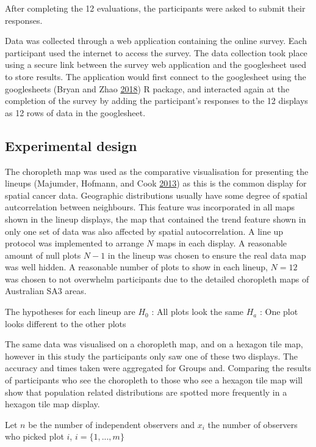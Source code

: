 \documentclass[conference,final,]{IEEEtran}
\begin{document}
After completing the 12 evaluations, the participants were asked to submit their responses.

Data was collected through a web application containing the online survey.
Each participant used the internet to access the survey.
The data collection took place using a secure link between the survey web application and the googlesheet used to store results. The application would first connect to the googlesheet using the googlesheets (Bryan and Zhao \protect\hyperlink{ref-sheets}{2018}) R package, and interacted again at the completion of the survey by adding the participant's responses to the 12 displays as 12 rows of data in the googlesheet.

\hypertarget{experimental-design}{%
\subsection{Experimental design}\label{experimental-design}}

The choropleth map was used as the comparative visualisation for presenting the lineups (Majumder, Hofmann, and Cook \protect\hyperlink{ref-VVSIALM}{2013}) as this is the common display for spatial cancer data.
Geographic distributions usually have some degree of spatial autcorrelation between neighbours.
This feature was incorporated in all maps shown in the lineup displays, the map that contained the trend feature shown in only one set of data was also affected by spatial autocorrelation.
A line up protocol was implemented to arrange \(N\) maps in each display.
A reasonable amount of null plots \(N-1\) in the lineup was chosen to ensure the real data map was well hidden. A reasonable number of plots to show in each lineup, \(N = 12\) was chosen to not overwhelm participants due to the detailed choropleth maps of Australian SA3 areas.

The hypotheses for each lineup are
\(H_0\) : All plots look the same
\(H_a\) : One plot looks different to the other plots

The same data was visualised on a choropleth map, and on a hexagon tile map, however in this study the participants only saw one of these two displays. The accuracy and times taken were aggregated for Groups and.
Comparing the results of participants who see the choropleth to those who see a hexagon tile map will show that population related distributions are spotted more frequently in a hexagon tile map display.

Let \(n\) be the number of independent observers and \(x_i\) the
number of observers who picked plot \(i\), \(i = \{1,...,m\}\)
\end{document}
